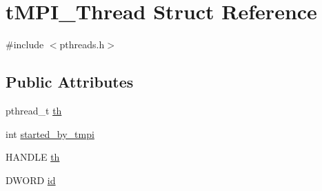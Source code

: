 \hypertarget{structtMPI__Thread}{\section{t\-M\-P\-I\-\_\-\-Thread \-Struct \-Reference}
\label{structtMPI__Thread}
}


{\ttfamily \#include $<$pthreads.\-h$>$}

\subsection*{\-Public \-Attributes}
\begin{DoxyCompactItemize}
\item 
pthread\-\_\-t \hyperlink{structtMPI__Thread_ae26903de3099795280c1e23e56d13d71}{th}
\item 
int \hyperlink{structtMPI__Thread_a50825dcad04a7de6a1c829e1ad56719f}{started\-\_\-by\-\_\-tmpi}
\item 
\-H\-A\-N\-D\-L\-E \hyperlink{structtMPI__Thread_a7f106219f558cc6effe6391d82d707ca}{th}
\item 
\-D\-W\-O\-R\-D \hyperlink{structtMPI__Thread_a6d4c76c0c3cd356f34b9cb74a8a87851}{id}
\end{DoxyCompactItemize}


